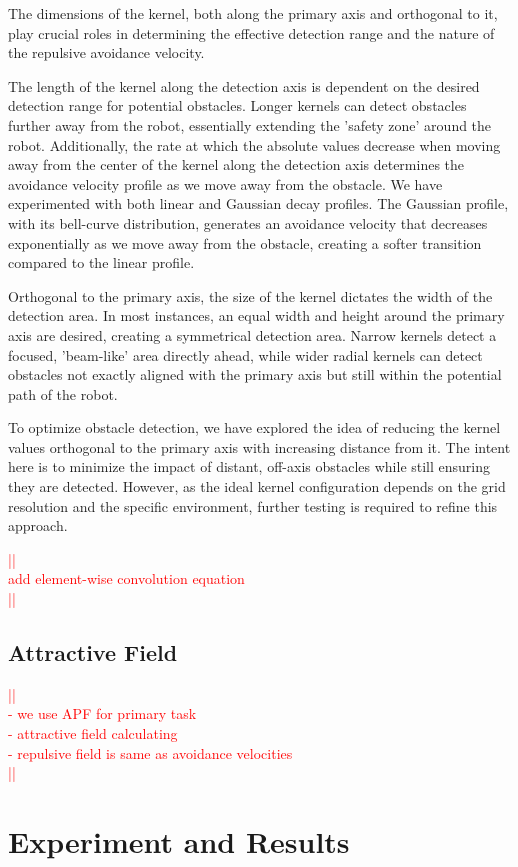 \documentclass[a4paper]{article}
\newcommand\todocomment[1]{\textcolor{red}{||\\ #1\\||}}
\begin{document}
The dimensions of the kernel, both along the primary axis and orthogonal to it, play crucial roles in determining the effective detection range and the nature of the repulsive avoidance velocity.

The length of the kernel along the detection axis is dependent on the desired detection range for potential obstacles. Longer kernels can detect obstacles further away from the robot, essentially extending the 'safety zone' around the robot. Additionally, the rate at which the absolute values decrease when moving away from the center of the kernel along the detection axis determines the avoidance velocity profile as we move away from the obstacle. We have experimented with both linear and Gaussian decay profiles. The Gaussian profile, with its bell-curve distribution, generates an avoidance velocity that decreases exponentially as we move away from the obstacle, creating a softer transition compared to the linear profile.

Orthogonal to the primary axis, the size of the kernel dictates the width of the detection area. In most instances, an equal width and height around the primary axis are desired, creating a symmetrical detection area. Narrow kernels detect a focused, 'beam-like' area directly ahead, while wider radial kernels can detect obstacles not exactly aligned with the primary axis but still within the potential path of the robot.

To optimize obstacle detection, we have explored the idea of reducing the kernel values orthogonal to the primary axis with increasing distance from it. The intent here is to minimize the impact of distant, off-axis obstacles while still ensuring they are detected. However, as the ideal kernel configuration depends on the grid resolution and the specific environment, further testing is required to refine this approach.

\todocomment{add element-wise convolution equation}

		 
\subsection{Attractive Field}

\todocomment{- we use APF for primary task\\
			 - attractive field calculating \\
		 	 - repulsive field is same as avoidance velocities}



\section{Experiment and Results}
\end{document}

